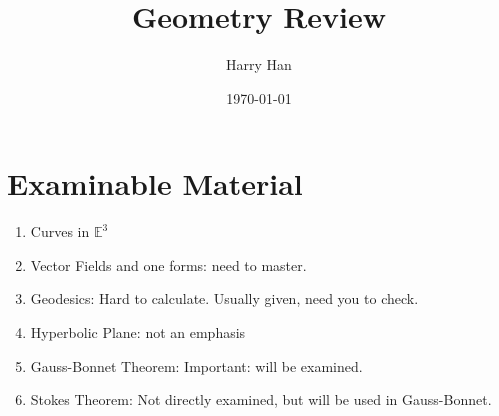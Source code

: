 \documentclass[12pt]{article}
\title{Geometry Review}
\author{Harry Han}
\date{\today}
\begin{document}
\section{Examinable Material}

\begin{enumerate}
	\item Curves in $\mathbb{E}^3$
	\item Vector Fields and one forms: need to master.
	\item Geodesics: Hard to calculate. Usually given, need you to check.
	\item Hyperbolic Plane: not an emphasis
	\item Gauss-Bonnet Theorem: Important: will be examined.
	\item Stokes Theorem: Not directly examined, but will be used in Gauss-Bonnet.
\end{enumerate}
\end{document}
